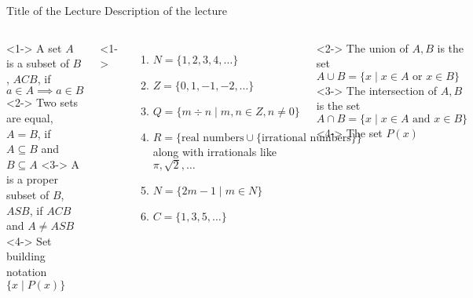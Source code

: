 \documentclass{beamer}
\begin{document}
\begin{frame}{}
  \begin{block}{Title of the Lecture}
    Description of the lecture
  \end{block}
  \begin{columns}
      <1-> A set $A$ is a subset of $B$, $ACB$, if $a \in A \implies a \in B$
      <2-> Two sets are equal, $A=B$, if $A \subseteq B$ and $B \subseteq A$
      <3-> A is a proper subset of $B$, $ASB$, if $ACB$ and $A \neq ASB$
      <4-> Set building notation $\{ x \mid P(x) \}$

      <1-> 
        \begin{enumerate}
          \item $N=\{1,2,3,4,\ldots\}$
          \item $Z=\{0,1,-1,-2,\ldots\}$
          \item $Q=\{m \div n \mid m,n \in Z, n \neq 0\}$
          \item $R = \{\text{real numbers} \cup \{\text{irrational numbers}\} \}$ along with irrationals like $\pi, \sqrt{2}, \ldots$
          \item $N=\{2m-1 \mid m \in N\}$
          \item $C=\{1,3,5,\ldots\}$
        \end{enumerate}
      <2-> The union of $A,B$ is the set $A \cup B = \{x \mid x \in A \text{ or } x \in B\}$
      <3-> The intersection of $A,B$ is the set $A \cap B = \{x \mid x \in A \text{ and } x \in B\}$
      <4-> The set $P(x)$
  \end{columns}
\end{frame}
\end{document}
